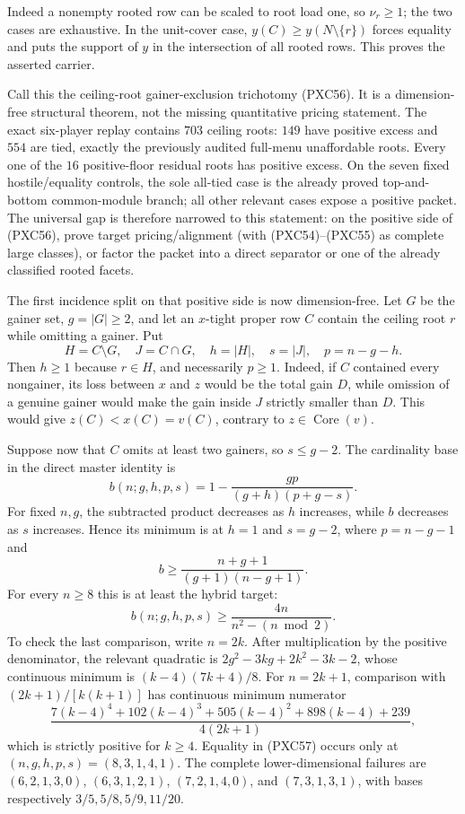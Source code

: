 \documentclass[11pt]{article}
\newcommand{\core}{\operatorname{Core}}
\begin{document}
Indeed a nonempty rooted row can be scaled to root load one, so
$\nu_r\ge1$; the two cases are exhaustive.  In the unit-cover case,
$y(C)\ge y(N\setminus\{r\})$ forces equality and puts the support of $y$ in
the intersection of all rooted rows.  This proves the asserted carrier.

Call this the ceiling-root gainer-exclusion trichotomy (PXC56).  It is a
dimension-free structural theorem, not the missing quantitative pricing
statement.  The exact six-player replay contains $703$ ceiling roots: $149$
have positive excess and $554$ are tied, exactly the previously audited
full-menu unaffordable roots.  Every one of the $16$ positive-floor residual
roots has positive excess.  On the seven fixed hostile/equality controls,
the sole all-tied case is the already proved top-and-bottom common-module
branch; all other relevant cases expose a positive packet.  The universal
gap is therefore narrowed to this statement: on the positive side of
(PXC56), prove target pricing/alignment (with (PXC54)--(PXC55) as complete
large classes), or factor the packet into a direct separator or one of the
already classified rooted facets.

The first incidence split on that positive side is now dimension-free.  Let
$G$ be the gainer set, $g=|G|\ge2$, and let an $x$-tight proper row $C$
contain the ceiling root $r$ while omitting a gainer.  Put
\[
 H=C\setminus G,\quad J=C\cap G,\quad
 h=|H|,\quad s=|J|,\quad p=n-g-h.
\]
Then $h\ge1$ because $r\in H$, and necessarily $p\ge1$.  Indeed, if $C$
contained every nongainer, its loss between $x$ and $z$ would be the total
gain $D$, while omission of a genuine gainer would make the gain inside
$J$ strictly smaller than $D$.  This would give $z(C)<x(C)=v(C)$,
contrary to $z\in\core(v)$.

Suppose now that $C$ omits at least two gainers, so $s\le g-2$.  The
cardinality base in the direct master identity is
\[
 b(n;g,h,p,s)=1-\frac{gp}{(g+h)(p+g-s)}.             \tag{PXC57a}
\]
For fixed $n,g$, the subtracted product decreases as $h$ increases, while
$b$ decreases as $s$ increases.  Hence its minimum is at $h=1$ and
$s=g-2$, where $p=n-g-1$ and
\[
 b\ge \frac{n+g+1}{(g+1)(n-g+1)}.                  \tag{PXC57b}
\]
For every $n\ge8$ this is at least the hybrid target:
\[
 \boxed{\qquad b(n;g,h,p,s)\ge
 \frac{4n}{n^2-(n\bmod2)}.\qquad}                  \tag{PXC57}
\]
To check the last comparison, write $n=2k$.  After multiplication by the
positive denominator, the relevant quadratic is
$2g^2-3kg+2k^2-3k-2$, whose continuous minimum is
$(k-4)(7k+4)/8$.  For $n=2k+1$, comparison with
$(2k+1)/[k(k+1)]$ has continuous minimum numerator
\[
 \frac{7(k-4)^4+102(k-4)^3+505(k-4)^2+898(k-4)+239}
 {4(2k+1)},
\]
which is strictly positive for $k\ge4$.  Equality in (PXC57) occurs only
at $(n,g,h,p,s)=(8,3,1,4,1)$.  The complete lower-dimensional failures are
$(6,2,1,3,0)$, $(6,3,1,2,1)$, $(7,2,1,4,0)$, and
$(7,3,1,3,1)$, with bases respectively $3/5,5/8,5/9,11/20$.
\end{document}
